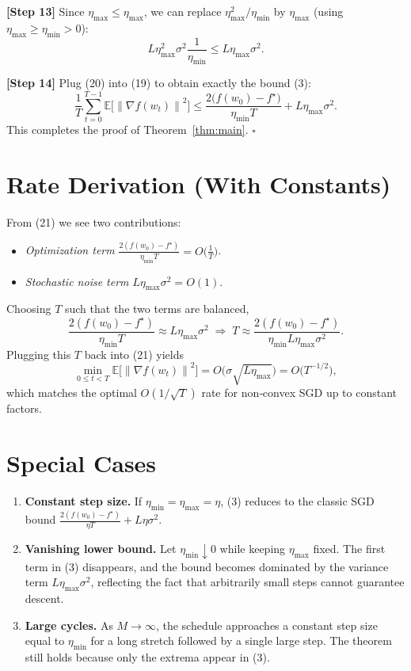 \documentclass{article}
\newcommand{\EE}{\mathbb{E}}
\newcommand{\norm}[1]{\left\lVert #1 \right\rVert}
\begin{document}
\noindent\textbf{[Step 13]} Since $\eta_{\max}\le\eta_{\max}$, we can replace $\eta_{\max}^{2}/\eta_{\min}$ by $\eta_{\max}$ (using $\eta_{\max}\ge\eta_{\min}>0$):
\[
L\eta_{\max}^{2}\sigma^{2}\frac{1}{\eta_{\min}}
\le L\eta_{\max}\sigma^{2}.
\tag{20}
\]

\noindent\textbf{[Step 14]} Plug (20) into (19) to obtain exactly the bound (3):
\[
\frac{1}{T}\sum_{t=0}^{T-1}\EE\!\bigl[\norm{\nabla f(w_t)}^{2}\bigr]
\le
\frac{2\bigl(f(w_0)-f^{\star}\bigr)}{\eta_{\min}T}
+ L\eta_{\max}\sigma^{2}.
\tag{21}
\]
This completes the proof of Theorem~\ref{thm:main}. \hfill $\square$

\section*{Rate Derivation (With Constants)}
From (21) we see two contributions:
\begin{itemize}
\item \emph{Optimization term} $\displaystyle\frac{2(f(w_0)-f^{\star})}{\eta_{\min}T}=O\!\bigl(\tfrac{1}{T}\bigr)$.
\item \emph{Stochastic noise term} $L\eta_{\max}\sigma^{2}=O(1)$.
\end{itemize}
Choosing $T$ such that the two terms are balanced,
\[
\frac{2(f(w_0)-f^{\star})}{\eta_{\min}T}\approx L\eta_{\max}\sigma^{2}
\;\Longrightarrow\;
T\approx\frac{2(f(w_0)-f^{\star})}{\eta_{\min}L\eta_{\max}\sigma^{2}}.
\]
Plugging this $T$ back into (21) yields
\[
\min_{0\le t<T}\EE\!\bigl[\norm{\nabla f(w_t)}^{2}\bigr]
=O\!\bigl(\sigma\sqrt{L\eta_{\max}}\bigr)
=O\!\bigl(T^{-1/2}\bigr),
\]
which matches the optimal $O(1/\sqrt{T})$ rate for non‑convex SGD up to constant factors.

\section*{Special Cases}
\begin{enumerate}
\item \textbf{Constant step size.} If $\eta_{\min}=\eta_{\max}=\eta$, (3) reduces to the classic SGD bound $\frac{2(f(w_0)-f^{\star})}{\eta T}+L\eta\sigma^{2}$.
\item \textbf{Vanishing lower bound.} Let $\eta_{\min}\downarrow0$ while keeping $\eta_{\max}$ fixed. The first term in (3) disappears, and the bound becomes dominated by the variance term $L\eta_{\max}\sigma^{2}$, reflecting the fact that arbitrarily small steps cannot guarantee descent.
\item \textbf{Large cycles.} As $M\to\infty$, the schedule approaches a constant step size equal to $\eta_{\min}$ for a long stretch followed by a single large step. The theorem still holds because only the extrema appear in (3).
\end{enumerate}
\end{document}
